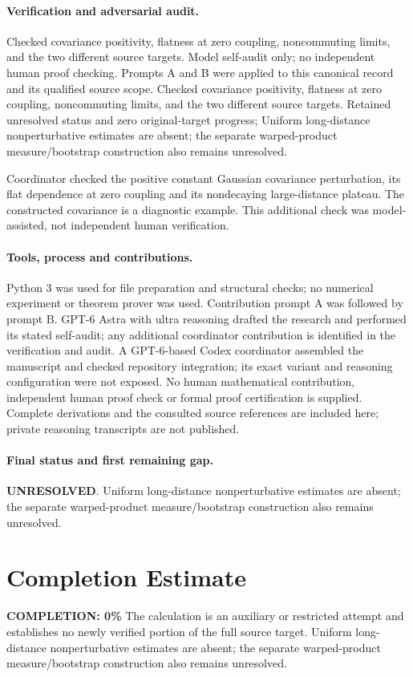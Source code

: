 \documentclass[11pt]{article}
\begin{document}
\paragraph{Verification and adversarial audit.}
Checked covariance positivity, flatness at zero coupling, noncommuting limits, and the two different source targets. Model self-audit only; no independent human proof checking. Prompts A and B were applied to this canonical record and its qualified source scope. Checked covariance positivity, flatness at zero coupling, noncommuting limits, and the two different source targets. Retained unresolved status and zero original-target progress; Uniform long-distance nonperturbative estimates are absent; the separate warped-product measure/bootstrap construction also remains unresolved.

Coordinator checked the positive constant Gaussian covariance perturbation, its flat dependence at zero coupling and its nondecaying large-distance plateau. The constructed covariance is a diagnostic example. This additional check was model-assisted, not independent human verification.

\paragraph{Tools, process and contributions.}
Python 3 was used for file preparation and structural checks; no numerical experiment or theorem prover was used. Contribution prompt A was followed by prompt B. GPT-6 Astra with ultra reasoning drafted the research and performed its stated self-audit; any additional coordinator contribution is identified in the verification and audit. A GPT-6-based Codex coordinator assembled the manuscript and checked repository integration; its exact variant and reasoning configuration were not exposed. No human mathematical contribution, independent human proof check or formal proof certification is supplied. Complete derivations and the consulted source references are included here; private reasoning transcripts are not published.

\paragraph{Final status and first remaining gap.}
\textbf{UNRESOLVED}. Uniform long-distance nonperturbative estimates are absent; the separate warped-product measure/bootstrap construction also remains unresolved.

\section{Completion Estimate}
\noindent\textbf{COMPLETION: 0\%}
The calculation is an auxiliary or restricted attempt and establishes no newly verified portion of the full source target. Uniform long-distance nonperturbative estimates are absent; the separate warped-product measure/bootstrap construction also remains unresolved.
\end{document}
